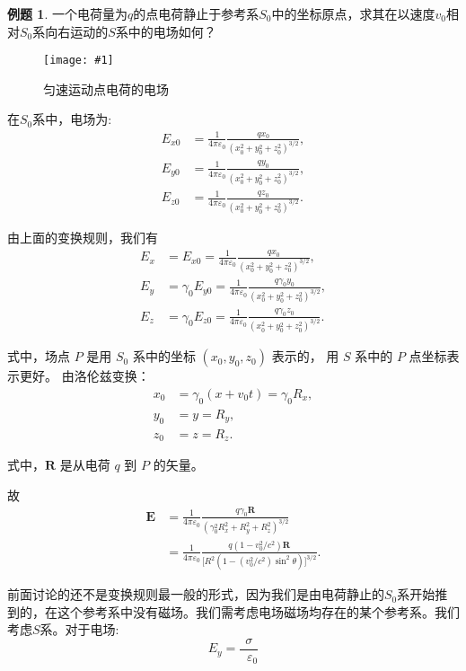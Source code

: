 \documentclass[12pt,a4paper,oneside]{report}
\theoremstyle{definition}
\newtheorem{example}{例题}[chapter]
\theoremstyle{remark}
\newcommand{\insertfig}[3]{
    \begin{figure}[ht]
        \centering
        \texttt{[image: \#1]}
        \caption{#2}
        \label{fig:#1}
    \end{figure}
}
\newcommand{\mb}[1]{\mathbf{#1}}
\renewcommand{\v}{\mathop{}\!\varepsilon}
\begin{document}
\begin{example}
  一个电荷量为$q$的点电荷静止于参考系$S_0$中的坐标原点，求其在以速度$v_0$相对$S_0$系向右运动的$S$系中的电场如何？

  \insertfig{5-8.png}{匀速运动点电荷的电场}{0.35}

在$S_0$系中，电场为:
\begin{align*}
E_{x0} &= \frac{1}{4\pi\varepsilon_0} \frac{q x_0}{(x_0^2 + y_0^2 + z_0^2)^{3/2}}, \\[6pt]
E_{y0} &= \frac{1}{4\pi\varepsilon_0} \frac{q y_0}{(x_0^2 + y_0^2 + z_0^2)^{3/2}}, \\[6pt]
E_{z0} &= \frac{1}{4\pi\varepsilon_0} \frac{q z_0}{(x_0^2 + y_0^2 + z_0^2)^{3/2}}.
\end{align*}

由上面的变换规则，我们有
\begin{align*}
E_x &= E_{x0} = \frac{1}{4\pi\varepsilon_0} \frac{q x_0}{(x_0^2 + y_0^2 + z_0^2)^{3/2}}, \\[6pt]
E_y &= \gamma_0 E_{y0} = \frac{1}{4\pi\varepsilon_0} \frac{q \gamma_0 y_0}{(x_0^2 + y_0^2 + z_0^2)^{3/2}}, \\[6pt]
E_z &= \gamma_0 E_{z0} = \frac{1}{4\pi\varepsilon_0} \frac{q \gamma_0 z_0}{(x_0^2 + y_0^2 + z_0^2)^{3/2}}.
\end{align*}

式中，场点 \( P \) 是用 \( S_0 \) 系中的坐标 \((x_0, y_0, z_0)\) 表示的，
用 \( S \) 系中的 \( P \) 点坐标表示更好。
由洛伦兹变换：
\begin{align*}
x_0 &= \gamma_0 (x + v_0 t) = \gamma_0 R_x, \\[4pt]
y_0 &= y = R_y, \\[4pt]
z_0 &= z = R_z.
\end{align*}

式中，\( \mathbf R \) 是从电荷 \( q \) 到 \( P \) 的矢量。

故
\begin{align*}
\mb{E} &= \frac{1}{4\pi\varepsilon_0} 
     \frac{q \gamma_0 \mathbf R}
          {(\gamma_0^2 R_x^2 + R_y^2 + R_z^2)^{3/2}} \\[6pt]
  &= \frac{1}{4\pi\varepsilon_0}
     \frac{q (1 - v_0^2/c^2) \mathbf R}
          {\bigl[R^2 (1 - (v_0^2/c^2)\sin^2\theta)\bigr]^{3/2}}. 
\end{align*}

\end{example}

前面讨论的还不是变换规则最一般的形式，因为我们是由电荷静止的$S_0$系开始推到的，在这个参考系中没有磁场。我们需考虑电场磁场均存在的某个参考系。我们考虑$S$系。对于电场:
\[
E_y = \frac{\sigma}{\v_0}
\]
\end{document}
